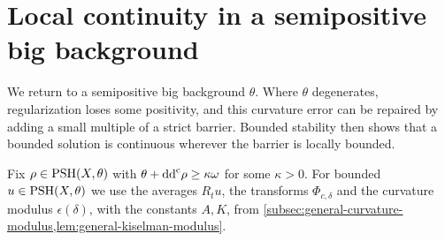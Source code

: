 \section{Local continuity in a semipositive big background}
\label{sec:local-big-continuity}

We return to a semipositive big background $\theta$. Where $\theta$ degenerates, regularization loses some positivity, and this curvature error can be repaired by adding a small multiple of a strict barrier. Bounded stability then shows that a bounded solution is continuous wherever the barrier is locally bounded.

Fix $\rho\in\mathrm{PSH}(X,\theta)$ with $\theta+\mathrm{dd}^{\mathrm{c}}\rho\geq\kappa\omega$ for some $\kappa>0$. For bounded $u\in\mathrm{PSH}(X,\theta)$ we use the averages $R_tu$, the transforms $\Phi_{c,\delta}$ and the curvature modulus $\epsilon(\delta)$, with the constants $A,K$, from \cref{subsec:general-curvature-modulus,lem:general-kiselman-modulus}.

